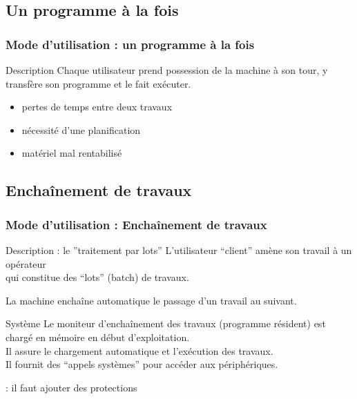 \documentclass{beamer}
\begin{document}
\subsection{Un programme à la fois}

\begin{frame}
\frametitle{Mode d'utilisation : un programme à la fois}

\begin{block}{Description}
Chaque utilisateur prend possession  de la machine à son tour,
y transfère son programme et le fait exécuter.
\end{block}

\begin{itemize}
\item pertes de temps entre deux travaux
\item nécessité d'une planification
\item matériel mal rentabilisé
\end{itemize}
\end{frame}


\subsection{Enchaînement de travaux}

\begin{frame}
\frametitle{Mode d'utilisation : Enchaînement de travaux}


\begin{block}{Description : le ''traitement par lots''}
L'utilisateur ``client'' amène son travail à un opérateur \\
qui constitue des ``lots'' (batch) de travaux.

La machine enchaîne automatique le passage d'un travail au suivant.
\end{block}

\begin{block}{Système}
Le \alert{moniteur d'enchaînement des travaux} (programme résident) est chargé en mémoire en début d'exploitation. \\
Il assure le chargement automatique et l'exécution des travaux.
\\ Il fournit des ``appels systèmes'' pour accéder aux périphériques.
\end{block}
 : il faut ajouter des \alert{protections}
\end{frame}
\end{document}
